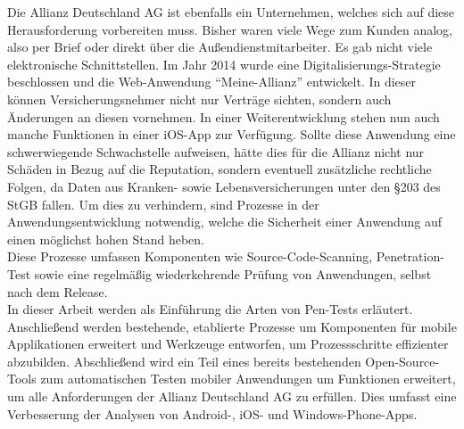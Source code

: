 Die Allianz Deutschland AG ist ebenfalls ein Unternehmen, welches sich auf diese Herausforderung vorbereiten muss. Bisher waren viele Wege zum Kunden analog, also per Brief oder direkt über die Außendienstmitarbeiter. Es gab nicht viele elektronische Schnittstellen. Im Jahr 2014 wurde eine Digitalisierungs-Strategie beschlossen und die Web-Anwendung "`Meine-Allianz"' entwickelt. In dieser können Versicherungsnehmer nicht nur Verträge sichten, sondern auch Änderungen an diesen vornehmen. In einer Weiterentwicklung stehen nun auch manche Funktionen in einer iOS-App zur Verfügung. Sollte diese Anwendung eine schwerwiegende Schwachstelle aufweisen, hätte dies für die Allianz nicht nur Schäden in Bezug auf die Reputation, sondern eventuell zusätzliche rechtliche Folgen, da Daten aus Kranken- sowie Lebensversicherungen unter den §203 des StGB fallen. Um dies zu verhindern, sind Prozesse in der Anwendungsentwicklung notwendig, welche die Sicherheit einer Anwendung auf einen möglichst hohen Stand heben.\\

Diese Prozesse umfassen Komponenten wie Source-Code-Scanning, Penetration-Test sowie eine regelmäßig wiederkehrende Prüfung von Anwendungen, selbst nach dem Release.\\

In dieser Arbeit werden als Einführung die Arten von Pen-Tests erläutert. Anschließend werden bestehende, etablierte Prozesse um Komponenten für mobile Applikationen erweitert und Werkzeuge entworfen, um Prozessschritte effizienter abzubilden. Abschließend wird ein Teil eines bereits bestehenden Open-Source-Tools zum automatischen Testen mobiler Anwendungen um Funktionen erweitert, um alle Anforderungen der Allianz Deutschland AG zu erfüllen. Dies umfasst eine Verbesserung der Analysen von Android-, iOS- und Windows-Phone-Apps.